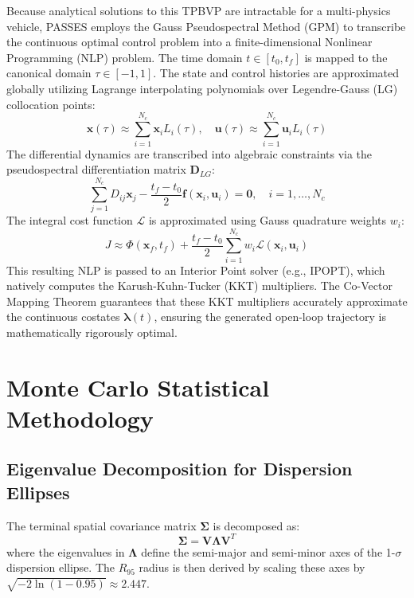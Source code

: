 \documentclass[11pt,a4paper]{article}
\theoremstyle{definition}
\numberwithin{equation}{section}
\begin{document}
\begin{appendices}
Because analytical solutions to this TPBVP are intractable for a multi-physics vehicle, PASSES employs the Gauss Pseudospectral Method (GPM) to transcribe the continuous optimal control problem into a finite-dimensional Nonlinear Programming (NLP) problem. The time domain $t \in [t_0, t_f]$ is mapped to the canonical domain $\tau \in [-1, 1]$. The state and control histories are approximated globally utilizing Lagrange interpolating polynomials over Legendre-Gauss (LG) collocation points:
\begin{equation}
    \mathbf{x}(\tau) \approx \sum_{i=1}^{N_c} \mathbf{x}_i L_i(\tau), \quad \mathbf{u}(\tau) \approx \sum_{i=1}^{N_c} \mathbf{u}_i L_i(\tau)
\end{equation}
The differential dynamics are transcribed into algebraic constraints via the pseudospectral differentiation matrix $\mathbf{D}_{LG}$:
\begin{equation}
    \sum_{j=1}^{N_c} D_{ij} \mathbf{x}_j - \frac{t_f - t_0}{2} \mathbf{f}(\mathbf{x}_i, \mathbf{u}_i) = \mathbf{0}, \quad i = 1, \dots, N_c
\end{equation}
The integral cost function $\mathcal{L}$ is approximated using Gauss quadrature weights $w_i$:
\begin{equation}
    J \approx \Phi(\mathbf{x}_f, t_f) + \frac{t_f - t_0}{2} \sum_{i=1}^{N_c} w_i \mathcal{L}(\mathbf{x}_i, \mathbf{u}_i)
\end{equation}
This resulting NLP is passed to an Interior Point solver (e.g., IPOPT), which natively computes the Karush-Kuhn-Tucker (KKT) multipliers. The Co-Vector Mapping Theorem guarantees that these KKT multipliers accurately approximate the continuous costates $\boldsymbol{\lambda}(t)$, ensuring the generated open-loop trajectory is mathematically rigorously optimal.

\section{Monte Carlo Statistical Methodology}
\label{app:stats}

\subsection{Eigenvalue Decomposition for Dispersion Ellipses}
The terminal spatial covariance matrix $\boldsymbol{\Sigma}$ is decomposed as:
\begin{equation}
    \boldsymbol{\Sigma} = \mathbf{V} \boldsymbol{\Lambda} \mathbf{V}^T
\end{equation}
where the eigenvalues in $\boldsymbol{\Lambda}$ define the semi-major and semi-minor axes of the 1-$\sigma$ dispersion ellipse. The $R_{95}$ radius is then derived by scaling these axes by $\sqrt{-2 \ln(1 - 0.95)} \approx 2.447$.


\end{appendices}
\end{document}

